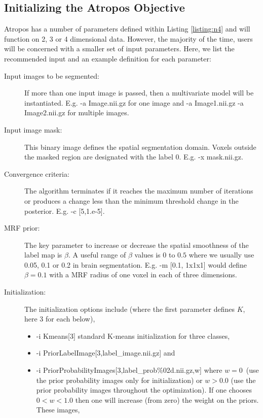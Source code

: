 \documentclass[11pt,english]{article}
\begin{document}
\subsection{Initializing the Atropos Objective}
Atropos has a number of parameters defined within
Listing \ref{listing:n4} and will function on 2, 3 or 4 dimensional
data.  However, the majority of the time, users will be concerned with
a smaller set of input parameters.  Here, we list the recommended input and
an example definition for each parameter:
\begin{description}
\item[Input images to be segmented:] If more than
  one input image is passed, then a multivariate model will be
  instantiated.  E.g.  {\ttfamily -a Image.nii.gz} for one image and
  {\ttfamily -a Image1.nii.gz -a Image2.nii.gz} for multiple images.
\item[Input image mask:] This binary image
  defines the spatial segmentation domain.  Voxels outside the
  masked region are designated with the label $0$.  E.g.  {\ttfamily -x mask.nii.gz}. 
\item[Convergence criteria:] The algorithm terminates if it reaches  the maximum number of iterations or
  produces a change less than the minimum threshold change in the posterior.
  E.g. {\ttfamily -c [5,1.e-5]}. 
\item[MRF prior:] The key parameter to increase or decrease the
  spatial smoothness of the label map is $\beta$.  A useful range of
  $\beta$ values is $0$ to $0.5$ where we usually use 0.05, 0.1 or 0.2
  in brain segmentation.  E.g.  {\ttfamily -m [0.1, 1x1x1]} would
  define $\beta=0.1$ with a MRF radius of one voxel in each of three dimensions.
\item[Initialization:] The initialization options include (where the
  first parameter defines $K$, here 3 for each below),
\begin{itemize}
\item  {\ttfamily -i  Kmeans[3]} standard K-means initialization for
  three classes,
\item  {\ttfamily -i  PriorLabelImage[3,label\_image.nii.gz]} and
\item  {\ttfamily -i  PriorProbabilityImages[3,label\_prob\%02d.nii.gz,w]} 
where $w=0$~(use the prior probability images only for
  initialization) or $w>0.0$ (use the prior probability images
  throughout the optimization).  If one chooses $0 < w < 1.0$ then one
  will increase (from zero) the weight on the priors.  These images,

\end{itemize}
\end{description}
\end{document}
